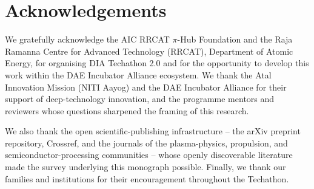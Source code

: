 \chapter*{Acknowledgements}

We gratefully acknowledge the AIC RRCAT $\pi$-Hub Foundation and the Raja Ramanna
Centre for Advanced Technology (RRCAT), Department of Atomic Energy, for
organising DIA Techathon 2.0 and for the opportunity to develop this work within
the DAE Incubator Alliance ecosystem. We thank the Atal Innovation Mission
(NITI Aayog) and the DAE Incubator Alliance for their support of deep-technology
innovation, and the programme mentors and reviewers whose questions sharpened the
framing of this research.

We also thank the open scientific-publishing infrastructure -- the arXiv preprint
repository, Crossref, and the journals of the plasma-physics, propulsion, and
semiconductor-processing communities -- whose openly discoverable literature made
the survey underlying this monograph possible. Finally, we thank our families and
institutions for their encouragement throughout the Techathon.
\cleardoublepage
